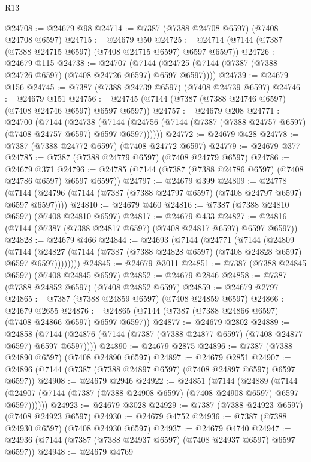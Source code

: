 \begin{lexlean}{R13}
\begin{coremodule}
@24708 := @24679 @98
@24714 := @7387 (@7388 @24708 @6597) (@7408 @24708 @6597)
@24715 := @24679 @50
@24725 := @24714 (@7144 (@7387 (@7388 @24715 @6597) (@7408 @24715 @6597) @6597 @6597))
@24726 := @24679 @115
@24738 := @24707
    (@7144 (@24725 (@7144 (@7387 (@7388 @24726 @6597) (@7408 @24726 @6597) @6597 @6597))))
@24739 := @24679 @156
@24745 := @7387 (@7388 @24739 @6597) (@7408 @24739 @6597)
@24746 := @24679 @151
@24756 := @24745 (@7144 (@7387 (@7388 @24746 @6597) (@7408 @24746 @6597) @6597 @6597))
@24757 := @24679 @208
@24771 := @24700
    (@7144
      (@24738
        (@7144 (@24756 (@7144 (@7387 (@7388 @24757 @6597) (@7408 @24757 @6597) @6597 @6597))))))
@24772 := @24679 @428
@24778 := @7387 (@7388 @24772 @6597) (@7408 @24772 @6597)
@24779 := @24679 @377
@24785 := @7387 (@7388 @24779 @6597) (@7408 @24779 @6597)
@24786 := @24679 @371
@24796 := @24785 (@7144 (@7387 (@7388 @24786 @6597) (@7408 @24786 @6597) @6597 @6597))
@24797 := @24679 @399
@24809 := @24778
    (@7144 (@24796 (@7144 (@7387 (@7388 @24797 @6597) (@7408 @24797 @6597) @6597 @6597))))
@24810 := @24679 @460
@24816 := @7387 (@7388 @24810 @6597) (@7408 @24810 @6597)
@24817 := @24679 @433
@24827 := @24816 (@7144 (@7387 (@7388 @24817 @6597) (@7408 @24817 @6597) @6597 @6597))
@24828 := @24679 @466
@24844 := @24693
    (@7144
      (@24771
        (@7144
          (@24809
            (@7144
              (@24827 (@7144 (@7387 (@7388 @24828 @6597) (@7408 @24828 @6597) @6597 @6597))))))))
@24845 := @24679 @3011
@24851 := @7387 (@7388 @24845 @6597) (@7408 @24845 @6597)
@24852 := @24679 @2846
@24858 := @7387 (@7388 @24852 @6597) (@7408 @24852 @6597)
@24859 := @24679 @2797
@24865 := @7387 (@7388 @24859 @6597) (@7408 @24859 @6597)
@24866 := @24679 @2655
@24876 := @24865 (@7144 (@7387 (@7388 @24866 @6597) (@7408 @24866 @6597) @6597 @6597))
@24877 := @24679 @2802
@24889 := @24858
    (@7144 (@24876 (@7144 (@7387 (@7388 @24877 @6597) (@7408 @24877 @6597) @6597 @6597))))
@24890 := @24679 @2875
@24896 := @7387 (@7388 @24890 @6597) (@7408 @24890 @6597)
@24897 := @24679 @2851
@24907 := @24896 (@7144 (@7387 (@7388 @24897 @6597) (@7408 @24897 @6597) @6597 @6597))
@24908 := @24679 @2946
@24922 := @24851
    (@7144
      (@24889
        (@7144 (@24907 (@7144 (@7387 (@7388 @24908 @6597) (@7408 @24908 @6597) @6597 @6597))))))
@24923 := @24679 @3028
@24929 := @7387 (@7388 @24923 @6597) (@7408 @24923 @6597)
@24930 := @24679 @4752
@24936 := @7387 (@7388 @24930 @6597) (@7408 @24930 @6597)
@24937 := @24679 @4740
@24947 := @24936 (@7144 (@7387 (@7388 @24937 @6597) (@7408 @24937 @6597) @6597 @6597))
@24948 := @24679 @4769

\end{coremodule}
\end{lexlean}
